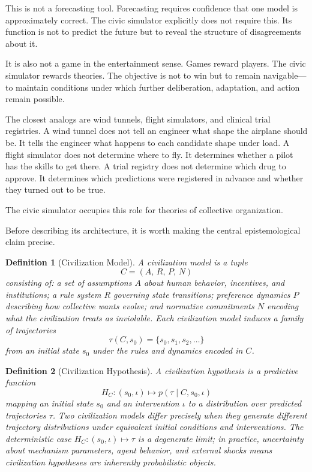 \documentclass[12pt]{article}
\newtheorem{definition}{Definition}
\begin{document}
This is not a forecasting tool. Forecasting requires confidence that one model is approximately correct. The civic simulator explicitly does not require this. Its function is not to predict the future but to reveal the structure of disagreements about it.

It is also not a game in the entertainment sense. Games reward players. The civic simulator rewards theories. The objective is not to win but to remain navigable---to maintain conditions under which further deliberation, adaptation, and action remain possible.

The closest analogs are wind tunnels, flight simulators, and clinical trial registries. A wind tunnel does not tell an engineer what shape the airplane should be. It tells the engineer what happens to each candidate shape under load. A flight simulator does not determine where to fly. It determines whether a pilot has the skills to get there. A trial registry does not determine which drug to approve. It determines which predictions were registered in advance and whether they turned out to be true.

The civic simulator occupies this role for theories of collective organization.

Before describing its architecture, it is worth making the central epistemological claim precise.

\begin{definition}[Civilization Model]
A civilization model is a tuple
\[
  C = (A,\, R,\, P,\, N)
\]
consisting of: a set of assumptions $A$ about human behavior, incentives, and institutions; a rule system $R$ governing state transitions; preference dynamics $P$ describing how collective wants evolve; and normative commitments $N$ encoding what the civilization treats as inviolable. Each civilization model induces a family of trajectories
\[
  \tau(C, s_0) = \{s_0, s_1, s_2, \ldots\}
\]
from an initial state $s_0$ under the rules and dynamics encoded in $C$.
\end{definition}

\begin{definition}[Civilization Hypothesis]
A civilization hypothesis is a predictive function
\[
  H_C : (s_0, \iota) \mapsto p(\tau \mid C, s_0, \iota)
\]
mapping an initial state $s_0$ and an intervention $\iota$ to a \emph{distribution} over predicted trajectories $\tau$. Two civilization models differ precisely when they generate different trajectory distributions under equivalent initial conditions and interventions. The deterministic case $H_C : (s_0, \iota) \mapsto \tau$ is a degenerate limit; in practice, uncertainty about mechanism parameters, agent behavior, and external shocks means civilization hypotheses are inherently probabilistic objects.
\end{definition}
\end{document}
